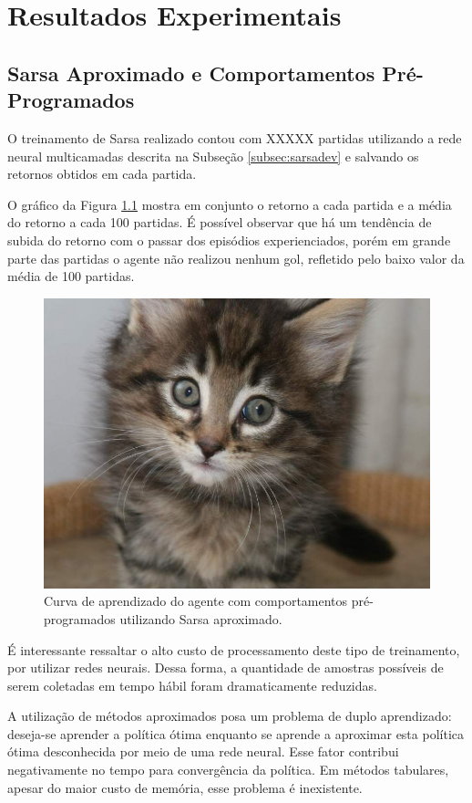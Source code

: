 \chapter{Resultados Experimentais}
\label{chap:Resultados}





\section{Sarsa Aproximado e Comportamentos Pré-Programados}

\par O treinamento de Sarsa realizado contou com XXXXX partidas utilizando a rede neural multicamadas descrita na Subseção \ref{subsec:sarsadev} e salvando os retornos obtidos em cada partida.
\par O gráfico da Figura \ref{fig:single-agent-sarsa-behaviors} mostra em conjunto o retorno a cada partida e a média do retorno a cada 100 partidas. É possível observar que há um tendência de subida do retorno com o passar dos episódios experienciados, porém em grande parte das partidas o agente não realizou nenhum gol, refletido pelo baixo valor da média de 100 partidas.
\begin{figure}[h]
	\includegraphics[width=0.9\linewidth]{figs/placekitty4-3.jpg}
	\centering
	\caption{Curva de aprendizado do agente com comportamentos pré-programados utilizando Sarsa aproximado.}
	\label{fig:single-agent-sarsa-behaviors}
\end{figure}
\par É interessante ressaltar o alto custo de processamento deste tipo de treinamento, por utilizar redes neurais. Dessa forma, a quantidade de amostras possíveis de serem coletadas em tempo hábil foram dramaticamente reduzidas.
\par A utilização de métodos aproximados posa um problema de duplo aprendizado: deseja-se aprender a política ótima enquanto se aprende a aproximar esta política ótima desconhecida por meio de uma rede neural. Esse fator contribui negativamente no tempo para convergência da política. Em métodos tabulares, apesar do maior custo de memória, esse problema é inexistente.

